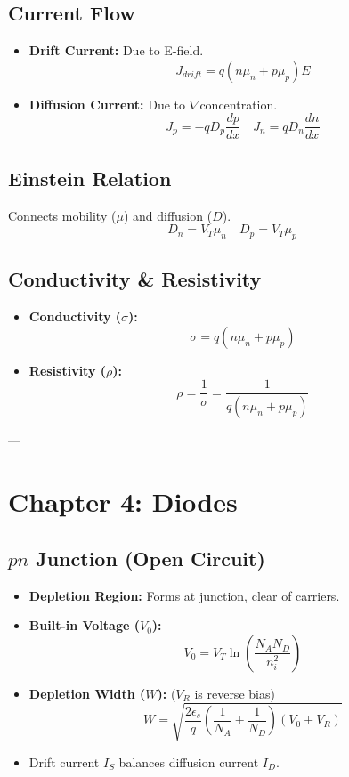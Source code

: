 \documentclass[10pt]{article}
\begin{document}
\begin{multicols*}{2}
\subsection*{Current Flow}
\begin{itemize}\itemsep0pt
    \item \textbf{Drift Current:} Due to E-field.
    \[ J_{drift} = q(n\mu_n + p\mu_p)E \]
    \item \textbf{Diffusion Current:} Due to $\nabla$concentration.
    \[ J_p = -qD_p \frac{dp}{dx} \quad J_n = qD_n \frac{dn}{dx} \]
\end{itemize}

\subsection*{Einstein Relation}
Connects mobility ($\mu$) and diffusion ($D$).
\[ D_n = V_T \mu_n \quad D_p = V_T \mu_p \]

\subsection*{Conductivity \& Resistivity}
\begin{itemize}\itemsep0pt
    \item \textbf{Conductivity ($\sigma$):}
    \[ \sigma = q(n\mu_n + p\mu_p) \]
    \item \textbf{Resistivity ($\rho$):}
    \[ \rho = \frac{1}{\sigma} = \frac{1}{q(n\mu_n + p\mu_p)} \]
\end{itemize}

--- %

\section{Chapter 4: Diodes}

\subsection*{$pn$ Junction (Open Circuit)}
\begin{itemize}\itemsep0pt
    \item \textbf{Depletion Region:} Forms at junction, clear of carriers.
    \item \textbf{Built-in Voltage ($V_0$):}
    \[ V_0 = V_T \ln\left(\frac{N_A N_D}{n_i^2}\right) \]
    \item \textbf{Depletion Width ($W$):} ($V_R$ is reverse bias)
    \[ W = \sqrt{\frac{2\epsilon_s}{q} \left(\frac{1}{N_A} + \frac{1}{N_D}\right) (V_0 + V_R)} \]
    \item Drift current $I_S$ balances diffusion current $I_D$.
\end{itemize}


\end{multicols*}
\end{document}
